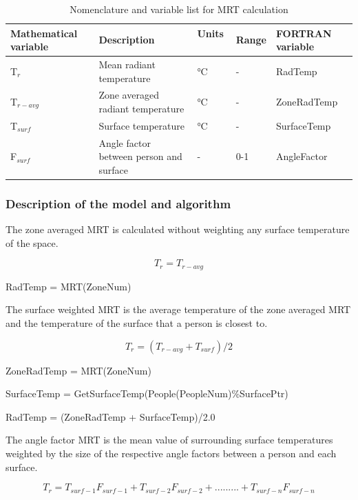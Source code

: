 \begin{longtable}[c]{p{1.2in}p{2.0in}p{0.8in}p{0.8in}p{1.2in}}
\caption{  Nomenclature and variable list for MRT calculation \protect \label{table:nomenclature-and-variable-list-for-mrt}}\\
\toprule 
Mathematical variable & Description & Units ~ & Range & FORTRAN variable \tabularnewline \midrule
\endhead
T\(_{r}\) & Mean radiant temperature & °C & - & RadTemp \tabularnewline
T\(_{r-avg}\) & Zone averaged radiant temperature & °C & - & ZoneRadTemp \tabularnewline
T\(_{surf}\) & Surface temperature & °C & - & SurfaceTemp \tabularnewline
F\(_{surf}\) & Angle factor between person and surface & - & 0-1 & AngleFactor \tabularnewline
\bottomrule
\end{longtable}

\subsubsection{Description of the model and algorithm}\label{description-of-the-model-and-algorithm-3}

The zone averaged MRT is calculated without weighting any surface temperature of the space.

\begin{equation}
{T_r} = {T_{r - avg}}
\end{equation}

RadTemp = MRT(ZoneNum)

The surface weighted MRT is the average temperature of the zone averaged MRT and the temperature of the surface that a person is closest to.

\begin{equation}
{T_r} = ({T_{r - avg}} + {T_{surf}})/2
\end{equation}

ZoneRadTemp = MRT(ZoneNum)

SurfaceTemp = GetSurfaceTemp(People(PeopleNum)\%SurfacePtr)

RadTemp = (ZoneRadTemp + SurfaceTemp)/2.0

The angle factor MRT is the mean value of surrounding surface temperatures weighted by the size of the respective angle factors between a person and each surface.

\begin{equation}
{T_r} = {T_{surf - 1}}{F_{surf - 1}} + {T_{surf - 2}}{F_{surf - 2}} + ......... + {T_{surf - n}}{F_{surf - n}}
\end{equation}

